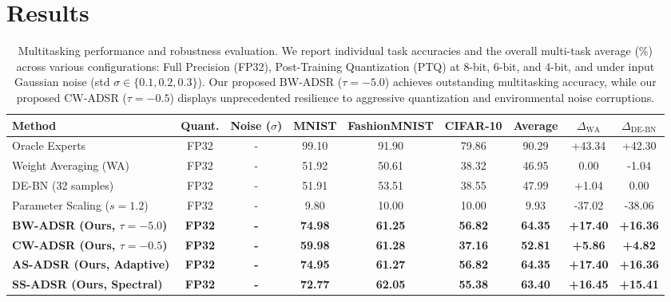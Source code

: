 \documentclass{article}
\theoremstyle{plain}
\theoremstyle{definition}
\theoremstyle{remark}
\begin{document}
\section{Results}
\label{sec:results}

\begin{table}[t]
\caption{Multitasking performance and robustness evaluation. We report individual task accuracies and the overall multi-task average (\%) across various configurations: Full Precision (FP32), Post-Training Quantization (PTQ) at 8-bit, 6-bit, and 4-bit, and under input Gaussian noise (std $\sigma \in \{0.1, 0.2, 0.3\}$). Our proposed BW-ADSR ($\tau = -5.0$) achieves outstanding multitasking accuracy, while our proposed CW-ADSR ($\tau = -0.5$) displays unprecedented resilience to aggressive quantization and environmental noise corruptions.}
\label{tab:results}
\vskip 0.15in
\begin{center}
\begin{small}
\begin{sc}
\setlength{\tabcolsep}{4.0pt}
\begin{tabular}{lcccccccc}
\toprule
Method & Quant. & Noise ($\sigma$) & MNIST & FashionMNIST & CIFAR-10 & Average & $\Delta_{\text{WA}}$ & $\Delta_{\text{DE-BN}}$ \\
\midrule
Oracle Experts & FP32 & - & 99.10 & 91.90 & 79.86 & 90.29 & +43.34 & +42.30 \\
Weight Averaging (WA) & FP32 & - & 51.92 & 50.61 & 38.32 & 46.95 & 0.00 & -1.04 \\
DE-BN (32 samples) & FP32 & - & 51.91 & 53.51 & 38.55 & 47.99 & +1.04 & 0.00 \\
Parameter Scaling ($s=1.2$) & FP32 & - & 9.80 & 10.00 & 10.00 & 9.93 & -37.02 & -38.06 \\
\textbf{BW-ADSR (Ours, $\tau = -5.0$)} & \textbf{FP32} & \textbf{-} & \textbf{74.98} & \textbf{61.25} & \textbf{56.82} & \textbf{64.35} & \textbf{+17.40} & \textbf{+16.36} \\
\textbf{CW-ADSR (Ours, $\tau = -0.5$)} & \textbf{FP32} & \textbf{-} & \textbf{59.98} & \textbf{61.28} & \textbf{37.16} & \textbf{52.81} & \textbf{+5.86} & \textbf{+4.82} \\
\textbf{AS-ADSR (Ours, Adaptive)} & \textbf{FP32} & \textbf{-} & \textbf{74.95} & \textbf{61.27} & \textbf{56.82} & \textbf{64.35} & \textbf{+17.40} & \textbf{+16.36} \\
\textbf{SS-ADSR (Ours, Spectral)} & \textbf{FP32} & \textbf{-} & \textbf{72.77} & \textbf{62.05} & \textbf{55.38} & \textbf{63.40} & \textbf{+16.45} & \textbf{+15.41} \\

\end{tabular}
\end{sc}
\end{small}
\end{center}
\end{table}
\end{document}
